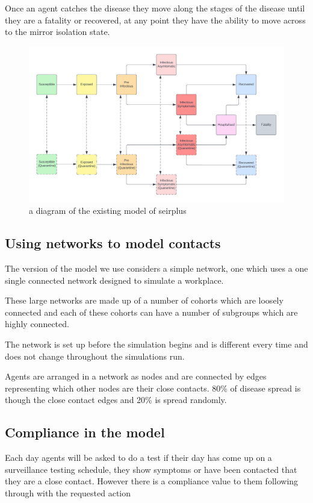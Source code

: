 \documentclass{article}
\begin{document}
Once an agent catches the disease they move along the stages of the disease until they are a fatality or recovered, at any point they have the ability to move across to the mirror isolation state. 



\begin{figure}
\centering
\includegraphics[width=\textwidth]{SIR}
\caption{a diagram of the existing model of seirplus ~\cite{mcgee_2021}}
\end{figure}

\newpage



\subsection{Using networks to model contacts}

The version of the model we use considers a simple network, one which uses a one single connected network designed to simulate a workplace.

These large networks are made up of a number of cohorts which are loosely connected and each of these cohorts can have a number of subgroups which are highly connected.

The network is set up before the simulation begins and is different every time and does not change throughout the simulations run. 

Agents are arranged in a network as nodes and are connected by edges representing which other nodes are their close contacts. 80\% of disease spread is though the close contact edges and 20\% is spread randomly.

\subsection{Compliance in the model}
Each day agents will be asked to do a test if their day has come up on a surveillance testing schedule, they show symptoms or have been contacted that they are a close contact. However there is a compliance value to them following through with the requested action
\end{document}
